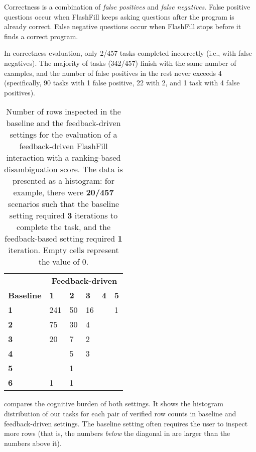 Correctness is a combination of \emph{false positives} and \emph{false negatives}.
False positive questions occur when FlashFill keeps asking questions after the program is already correct.
False negative questions occur when FlashFill stops before it finds a correct program.

In correctness evaluation, only 2/457 tasks completed incorrectly (i.e., with false negatives).
The majority of tasks (342/457) finish with the same number of examples, and the number of false positives in the rest
never exceeds 4 (specifically, 90 tasks with 1 false positive, 22 with 2, and 1 task with 4 false positives).

\begin{table}[t]
    \centering
    \begin{tabular}{llllll}
        \toprule
        & \multicolumn{5}{c}{\textbf{Feedback-driven}} \\
        \cmidrule{2-6}
        \textbf{Baseline} & \textbf{1} & \textbf{2} & \textbf{3} & \textbf{4} & \textbf{5} \\
        \midrule
        \textbf{1} & 241 & 50 & 16 &   & 1 \\
        \textbf{2} & 75 & 30 & 4 &   &   \\
        \textbf{3} & 20 & 7 & 2 &   &   \\
        \textbf{4} &   & 5 & 3 &   &   \\
        \textbf{5} &   & 1 &   &   &   \\
        \textbf{6} & 1 & 1 &   &   &   \\
        \bottomrule
    \end{tabular}
    \uwsinglespace
    \caption{Number of rows inspected in the baseline and the feedback-driven settings for the evaluation of
        a feedback-driven FlashFill interaction with a ranking-based disambiguation score.
        The data is presented as a histogram: for example, there were \textbf{20/457} scenarios such that the baseline
        setting required \textbf{3} iterations to complete the task, and the feedback-based setting required \textbf{1}
        iteration.
        Empty cells represent the value of $0$.}
    \label{tbl:feedback:ff:iterations}
\end{table}

 compares the cognitive burden of both settings.
It shows the histogram distribution of our tasks for each pair of verified row counts in baseline and feedback-driven
settings.
The baseline setting often requires the user to inspect more rows (that is, the numbers \emph{below} the diagonal in
 are larger than the numbers above it).
